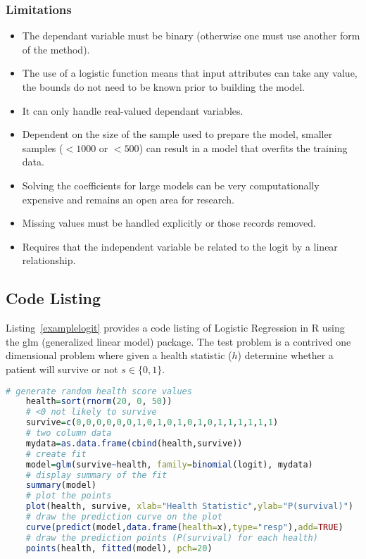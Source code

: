 \subsubsection{Limitations}

\begin{itemize}
	\item The dependant variable must be binary (otherwise one must use another form of the method).
	\item The use of a logistic function means that input attributes can take any value, the bounds do not need to be known prior to building the model.
	\item It can only handle real-valued dependant variables.
	\item Dependent on the size of the sample used to prepare the model, smaller samples ($<1000$ or $<500$) can result in a model that overfits the training data.
	\item Solving the coefficients for large models can be very computationally expensive and remains an open area for research.
	\item Missing values must be handled explicitly or those records removed.
	\item Requires that the independent variable be related to the logit by a linear relationship.
\end{itemize}


\subsection{Code Listing}
Listing~\ref{examplelogit} provides a code listing of Logistic Regression in R using the glm (generalized linear model) package. The test problem is a contrived one dimensional problem where given a health statistic ($h$) determine whether a patient will survive or not $s\in\{0,1\}$.

\begin{lstlisting}[language=r,label=examplelogit,caption={Example of Logistic Regression in R}]
	# generate random health score values
	health=sort(rnorm(20, 0, 50))
	# <0 not likely to survive
	survive=c(0,0,0,0,0,0,1,0,1,0,1,0,1,0,1,1,1,1,1,1)
	# two column data
	mydata=as.data.frame(cbind(health,survive))
	# create fit
	model=glm(survive~health, family=binomial(logit), mydata)
	# display summary of the fit
	summary(model)
	# plot the points
	plot(health, survive, xlab="Health Statistic",ylab="P(survival)")
	# draw the prediction curve on the plot
	curve(predict(model,data.frame(health=x),type="resp"),add=TRUE)
	# draw the prediction points (P(survival) for each health)
	points(health, fitted(model), pch=20)
\end{lstlisting}

